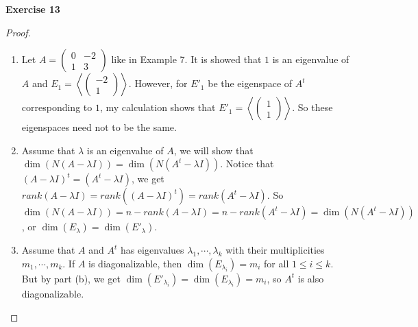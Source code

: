 \documentclass[12pt, a4paper]{article}
\theoremstyle{plain}
\newenvironment{exercise}[2][Exercise]
    { \begin{mdframed}[backgroundcolor=gray!20] \textbf{#1 #2} \\}
    {  \end{mdframed}}
\begin{document}
\begin{exercise}{13}

\end{exercise}
	\begin{proof}
	\hfill
	\begin{enumerate}[label=(\alph*)]
	\item Let $A=\begin{pmatrix}
	0&-2\\
	1&3
	\end{pmatrix}$ like in Example 7. It is showed that $1$ is an eigenvalue of $A$ and $E_{1}=\left\langle{\begin{pmatrix}
	-2\\
	1
	\end{pmatrix}}\right\rangle$. However, for $E'_{1}$ be the eigenspace of $A^t$ corresponding to $1$, my calculation shows that $E'_1=\left\langle{\begin{pmatrix}
	1\\
	1
	\end{pmatrix}}\right\rangle$. So these eigenspaces need not to be the same.
	
	\item Assume that $\lambda$ is an eigenvalue of $A$, we will show that $\dim(N(A-\lambda I))=\dim(N(A^t-\lambda I))$. Notice that $(A-\lambda I)^t=(A^t-\lambda I)$, we get $rank(A - \lambda I)=rank((A-\lambda I)^t)=rank(A^t-\lambda I)$. So $\dim(N(A-\lambda I))=n-rank(A-\lambda I)=n-rank(A^t-\lambda I)=\dim(N(A^t-\lambda I))$, or $\dim(E_\lambda)=\dim(E'_\lambda)$.
	
	\item Assume that $A$ and $A^t$ has eigenvalues $\lambda_1,\cdots,\lambda_k$ with their multiplicities $m_1,\cdots,m_k$. If $A$ is diagonalizable, then $\dim(E_{\lambda_i})=m_i$ for all $1\leq i\leq k$. But by part (b), we get $\dim(E'_{\lambda_i})=\dim(E_{\lambda_i})=m_i$, so $A^t$ is also diagonalizable.
	\end{enumerate}
	\end{proof}
\pagebreak
\end{document}
